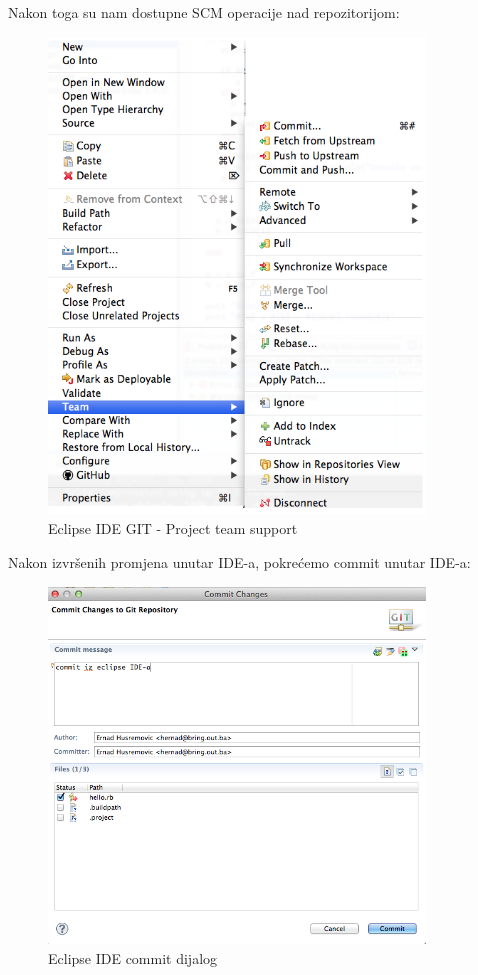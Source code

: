 \documentclass[times, utf8, seminar]{fit}
\begin{document}
\begin{itemize}
Nakon toga su nam dostupne SCM operacije nad repozitorijom:
\begin{figure}[H]
\centering
\includegraphics[width=10cm]{img/eclipse_git_02.png}
\caption{Eclipse IDE GIT - Project team support}
\end{figure}

Nakon izvršenih promjena unutar IDE-a, pokrećemo commit unutar IDE-a:
\begin{figure}[H]
\centering
\includegraphics[width=10cm]{img/eclipse_git_03.png}
\caption{Eclipse IDE commit dijalog}
\end{figure}


\end{itemize}
\end{document}
